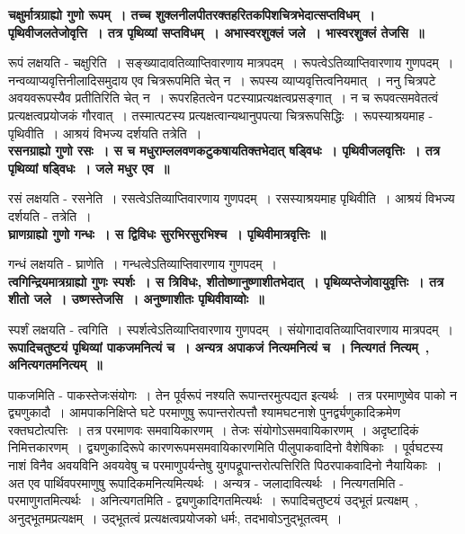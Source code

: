 {\bfseries चक्षुर्मात्रग्राह्यो गुणो रूपम्~। तच्च शुक्लनीलपीतरक्तहरितकपिशचित्रभेदात्सप्तविधम्~। पृथिवीजलतेजोवृत्ति~। तत्र पृथिव्यां सप्तविधम्~। अभास्वरशुक्लं जले~। भास्वरशुक्लं तेजसि~॥}\par
	रूपं लक्षयति - चक्षुरिति~। सङ्ख्यादावतिव्याप्तिवारणाय मात्रपदम्~। रूपत्वेऽतिव्याप्तिवारणाय गुणपदम्~। नन्वव्याप्यवृत्तिनीलादिसमुदाय एव चित्ररूपमिति चेत् न~। रूपस्य व्याप्यवृत्तित्वनियमात्~। ननु चित्रपटे अवयवरूपस्यैव प्रतीतिरिति चेत् न~। रूपरहितत्वेन पटस्याप्रत्यक्षत्वप्रसङ्गात्~। न च रूपवत्समवेतत्वं प्रत्यक्षत्वप्रयोजकं गौरवात्~। तस्मात्पटस्य प्रत्यक्षत्वान्यथानुपपत्या चित्ररूपसिद्धिः~। रूपस्याश्रयमाह - पृथिवीति~। आश्रयं विभज्य दर्शयति तत्रेति~।\\[10pt]
{\bfseries रसनग्राह्यो गुणो रसः~। स च मधुराम्ललवणकटुकषायतिक्तभेदात् षड्विधः~। पृथिवीजलवृत्तिः~। तत्र पृथिव्यां षड्विधः~। जले मधुर एव~॥}\par
	रसं लक्षयति - रसनेति~। रसत्वेऽतिव्याप्तिवारणाय गुणपदम्~। रसस्याश्रयमाह पृथिवीति~। आश्रयं विभज्य दर्शयति - तत्रेति~।\\[10pt]
{\bfseries घ्राणग्राह्यो गुणो गन्धः~। स द्विविधः सुरभिरसुरभिश्च~। पृथिवीमात्रवृत्तिः~॥}\par
	गन्धं लक्षयति - घ्राणेति~। गन्धत्वेऽतिव्याप्तिवारणाय गुणपदम्~।\\[10pt]
{\bfseries त्वगिन्द्रियमात्रग्राह्यो गुणः स्पर्शः~। स त्रिविधः, शीतोष्णानुष्णाशीतभेदात्~। पृथिव्यप्तेजोवायुवृत्तिः~। तत्र शीतो जले~। उष्णस्तेजसि~। अनुष्णाशीतः पृथिवीवाय्वोः~॥}\par
	स्पर्शं लक्षयति - त्वगिति~। स्पर्शत्वेऽतिव्याप्तिवारणाय गुणपदम्~। संयोगादावतिव्याप्तिवारणाय मात्रपदम्~।\\[10pt]
{\bfseries रूपादिचतुष्टयं पृथिव्यां पाकजमनित्यं च~। अन्यत्र अपाकजं नित्यमनित्यं च~। नित्यगतं नित्यम्~, अनित्यगतमनित्यम्~॥}\par
	पाकजमिति - पाकस्तेजःसंयोगः~। तेन पूर्वरूपं नश्यति रूपान्तरमुत्पद्यत इत्यर्थः~। तत्र परमाणुष्वेव पाको न द्व्यणुकादौ~। आमपाकनिक्षिप्ते घटे परमाणुषु रूपान्तरोत्पत्तौ श्यामघटनाशे पुनर्द्व्यणुकादिक्रमेण रक्तघटोत्पत्तिः~। तत्र परमाणवः समवायिकारणम्~। तेजः संयोगोऽसमवायिकारणम्~। अदृष्टादिकं निमित्तकारणम्~। द्व्यणुकादिरूपे कारणरूपमसमवायिकारणमिति पीलुपाकवादिनो वैशेषिकाः~। पूर्वघटस्य नाशं विनैव अवयविनि अवयवेषु च परमाणुपर्यन्तेषु युगपद्रूपान्तरोत्पत्तिरिति पिठरपाकवादिनो नैयायिकाः~। अत एव पार्थिवपरमाणुषु रूपादिकमनित्यमित्यर्थः~। अन्यत्र - जलादावित्यर्थः~। नित्यगतमिति - परमाणुगतमित्यर्थः~। अनित्यगतमिति - द्व्यणुकादिगतमित्यर्थः~। रूपादिचतुष्टयं उद्भूतं प्रत्यक्षम्~, अनुद्भूतमप्रत्यक्षम्~। उद्भूतत्वं प्रत्यक्षत्वप्रयोजको धर्मः, तदभावोऽनुद्भूतत्वम्~।\\[10pt]

